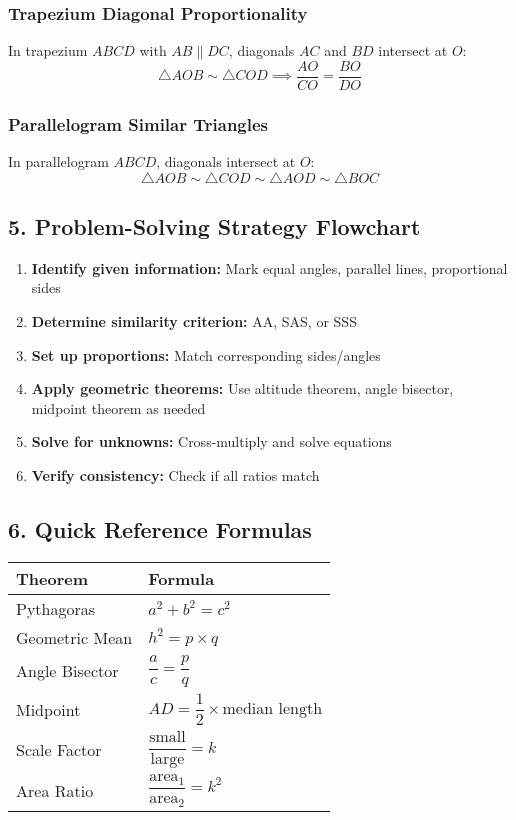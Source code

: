 \documentclass{article}
\begin{document}
\subsubsection*{Trapezium Diagonal Proportionality}
In trapezium $ABCD$ with $AB \parallel DC$, diagonals $AC$ and $BD$ intersect at $O$:
\[
\triangle AOB \sim \triangle COD \implies \dfrac{AO}{CO} = \dfrac{BO}{DO}
\]

\subsubsection*{Parallelogram Similar Triangles}
In parallelogram $ABCD$, diagonals intersect at $O$:
\[
\triangle AOB \sim \triangle COD \sim \triangle AOD \sim \triangle BOC
\]

\subsection*{5. Problem-Solving Strategy Flowchart}

\begin{enumerate}
\item \textbf{Identify given information:} Mark equal angles, parallel lines, proportional sides
\item \textbf{Determine similarity criterion:} AA, SAS, or SSS
\item \textbf{Set up proportions:} Match corresponding sides/angles
\item \textbf{Apply geometric theorems:} Use altitude theorem, angle bisector, midpoint theorem as needed
\item \textbf{Solve for unknowns:} Cross-multiply and solve equations
\item \textbf{Verify consistency:} Check if all ratios match
\end{enumerate}

\subsection*{6. Quick Reference Formulas}

\begin{tabular}{|l|l|}
\hline
\textbf{Theorem} & \textbf{Formula} \\
\hline
Pythagoras & $a^2 + b^2 = c^2$ \\
Geometric Mean & $h^2 = p \times q$ \\
Angle Bisector & $\dfrac{a}{c} = \dfrac{p}{q}$ \\
Midpoint & $AD = \dfrac{1}{2} \times \text{median length}$ \\
Scale Factor & $\dfrac{\text{small}}{\text{large}} = k$ \\
Area Ratio & $\dfrac{\text{area}_1}{\text{area}_2} = k^2$ \\
\hline
\end{tabular}
\end{document}
